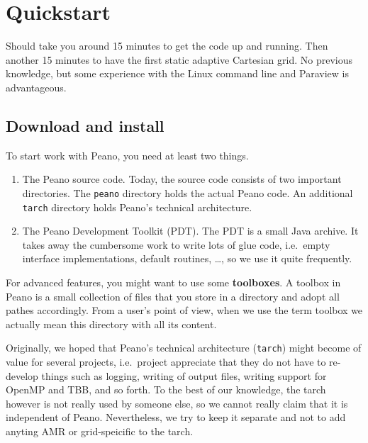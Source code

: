 \chapter{Quickstart}
\label{chapter:quickstart}


\chapterDescription
  {
    Should take you around 15 minutes to get the
    code up and running. Then another 15 minutes to have the first static
    adaptive Cartesian grid.
  }
  {
    No previous knowledge, but some experience with the Linux
    command line and Paraview is advantageous.
  }



\section{Download and install}

To start work with Peano, you need at least two things.

\begin{enumerate}
  \item The Peano source code. Today, the source code consists of two important
  directories. The \texttt{peano} directory holds the actual Peano code. An
  additional \texttt{tarch} directory holds Peano's technical architecture.
  \item The Peano Development Toolkit (PDT). The PDT is a small Java archive. It
  takes away the cumbersome work to write lots of glue code, i.e.~empty
  interface implementations, default routines, \ldots, so we use it quite
  frequently.
\end{enumerate}

\noindent
For advanced features, you might want to use some {\bf toolboxes}.
A toolbox in Peano is a small collection of files that you store in a directory
and adopt all pathes accordingly.
From a user's point of view, when we use the term toolbox we actually mean this
directory with all its content.



\begin{remark}
Originally, we hoped that Peano's technical architecture (\texttt{tarch}) might
become of value for several projects, i.e.~project appreciate that they do not
have to re-develop things such as logging, writing of output files, writing
support for OpenMP and TBB, and so forth.
To the best of our knowledge, the tarch however is not really used by someone
else, so we cannot really claim that it is independent of Peano.
Nevertheless, we try to keep it separate and not to add anyting AMR or
grid-speicific to the tarch.
\end{remark}

